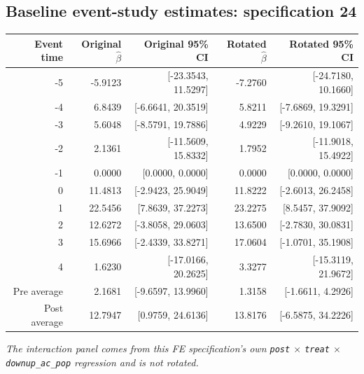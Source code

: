 \documentclass[10pt]{article}
\begin{document}
\subsection*{Baseline event-study estimates: specification 24}
\begin{center}
\scriptsize
\begin{tabular}{r rr rr}
\toprule
Event time & Original $\hat\beta$ & Original 95\% CI & Rotated $\hat\beta$ & Rotated 95\% CI \\
\midrule
-5 & -5.9123 & [-23.3543, 11.5297] & -7.2760 & [-24.7180, 10.1660] \\
-4 & 6.8439 & [-6.6641, 20.3519] & 5.8211 & [-7.6869, 19.3291] \\
-3 & 5.6048 & [-8.5791, 19.7886] & 4.9229 & [-9.2610, 19.1067] \\
-2 & 2.1361 & [-11.5609, 15.8332] & 1.7952 & [-11.9018, 15.4922] \\
-1 & 0.0000 & [0.0000, 0.0000] & 0.0000 & [0.0000, 0.0000] \\
0 & 11.4813 & [-2.9423, 25.9049] & 11.8222 & [-2.6013, 26.2458] \\
1 & 22.5456 & [7.8639, 37.2273] & 23.2275 & [8.5457, 37.9092] \\
2 & 12.6272 & [-3.8058, 29.0603] & 13.6500 & [-2.7830, 30.0831] \\
3 & 15.6966 & [-2.4339, 33.8271] & 17.0604 & [-1.0701, 35.1908] \\
4 & 1.6230 & [-17.0166, 20.2625] & 3.3277 & [-15.3119, 21.9672] \\
\midrule
Pre average & 2.1681 & [-9.6597, 13.9960] & 1.3158 & [-1.6611, 4.2926] \\
Post average & 12.7947 & [0.9759, 24.6136] & 13.8176 & [-6.5875, 34.2226] \\
\bottomrule
\end{tabular}
\end{center}
\medskip
\textit{The interaction panel comes from this FE specification's own \texttt{post} $\times$ \texttt{treat} $\times$ \texttt{downup\_ac\_pop} regression and is not rotated.}
\clearpage
\end{document}

